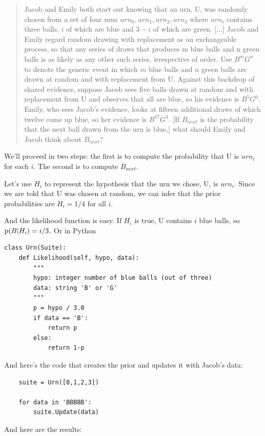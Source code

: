 \documentclass[12pt]{book}
\begin{document}
\begin{quote}
Jacob and Emily both start out knowing that an urn, U, was
randomly chosen from a set of four urns ${urn_0, urn_1, urn_2, urn_3}$
where $urn_i$ contains three balls, $i$ of which are blue and $3-i$ of
which are green. [...]  Jacob and Emily regard random drawing with
replacement as an exchangeable process, so that any series of draws
that produces m blue balls and n green balls is as likely as any other
such series, irrespective of order.  Use $B^m G^n$ to denote the generic
event in which $m$ blue balls and $n$ green balls are drawn at random
and with replacement from U.  Against this backdrop of shared
evidence, suppose Jacob sees five balls drawn at random and with
replacement from U and observes that all are blue, so his evidence is
$B^5 G^0$.  Emily, who sees Jacob's evidence, looks at fifteen additional
draws of which twelve come up blue, so her evidence is $B^{17} G^3$.  [If
$B_{next}$ is the probability that the next ball drawn from the urn is
blue,] what should Emily and Jacob think about $B_{next}$?
\end{quote}

We'll proceed in two steps: the first is to compute the probability
that U is $urn_i$ for each $i$.  The second is to compute $B_{next}$.

Let's use $H_i$ to represent the hypothesis that the urn we chose, U,
is $urn_i$.  Since we are told that U was chosen at random, we can
infer that the prior probabilities are $H_i = 1/4$ for all $i$.

And the likelihood function is easy.  If $H_i$ is true, U contains
$i$ blue balls, so $\mathrm{p}(B|H_i) = i/3$.  Or in Python

\begin{verbatim}
class Urn(Suite):
    def Likelihood(self, hypo, data):
        """
        hypo: integer number of blue balls (out of three)
        data: string 'B' or 'G'
        """
        p = hypo / 3.0
        if data == 'B':
            return p
        else:
            return 1-p
\end{verbatim}

And here's the code that creates the prior and updates it
with Jacob's data:

\begin{verbatim}
    suite = Urn([0,1,2,3])

    for data in 'BBBBB':
        suite.Update(data)
\end{verbatim}

And here are the results:
\end{document}
